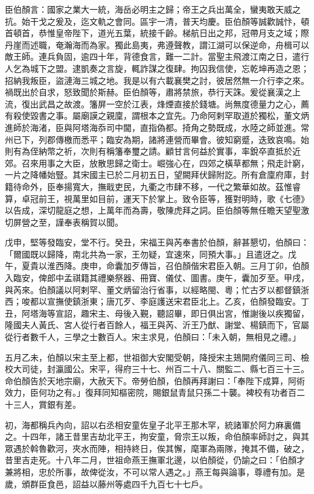 \begin{pinyinscope}
 臣伯顏言：國家之業大一統，海岳必明主之歸；帝王之兵出萬全，蠻夷敢天威之抗。始干戈之爰及，迄文軌之會同。區宇一清，普天均慶。臣伯顏等誠歡誠忭，頓首頓首，恭惟皇帝陛下，道光五葉，統接千齡。梯航日出之邦，冠帶月支之域；際丹崖而述職，奄瀚海而為家。獨此島夷，弗遵聲教，謂江湖可以保逆命，舟楫可以敵王師。連兵負固，逾四十年，背德食言，難一二計。當聖主飛渡江南之日，遣行人乞為城下之盟。逮凱奏之言旋，輒詐謀之復肆。拘囚我信使，忘乾坤再造之恩；招納我叛臣，盜漣海三城之地。我是以有六載襄樊之討，彼居然無一介行李之來。禍既出於自求，怒致聞於斯赫。臣伯顏等，肅將禁旅，恭行天誅。爰從襄漢之上流，復出武昌之故渡。籓屏一空於江表，烽煙直接於錢塘。尚無度德量力之心，薦有殺使毀書之事。屬廟謨之親廩，謂根本之宜先。乃命阿剌罕取道於獨松，董文炳進師於海渚，臣與阿塔海忝司中閫，直指偽都。掎角之勢既成，水陸之師並進。常州已下，列郡傳檄而悉平；臨安為期，諸將連營而畢會。彼知窮蹙，迭致哀鳴。始則有為侄納幣之祈，次則有稱籓奉璽之請。顧甘言何益於實事，率銳卒直抵於近郊。召來用事之大臣，放散思歸之衛士。崛強心在，四郊之橫草都無；飛走計窮，一片之降幡始豎。其宋國主已於二月初五日，望闕拜伏歸附訖。所有倉廩府庫，封籍待命外，臣奉揚寬大，撫戢吏民，九衢之市肆不移，一代之繁華如故。茲惟睿算，卓冠前王，視萬里如目前，運天下於掌上。致令臣等，獲對明時，歌《七德》以告成，深切龍庭之想，上萬年而為壽，敬陳虎拜之詞。臣伯顏等無任瞻天望聖激切屏營之至，謹奉表稱賀以聞。



 戊申，堅等發臨安，堂不行。癸丑，宋福王與芮奉書於伯顏，辭甚懇切，伯顏曰：「爾國既以歸降，南北共為一家，王勿疑，宜速來，同預大事。」且遣迓之。戊午，夏貴以淮西降。庚申，命囊加歹傳旨，召伯顏偕宋君臣入朝。三月丁卯，伯顏入臨安，俾郎中孟祺籍其禮樂祭器、冊寶、儀仗、圖書。庚午，囊加歹至。甲戌，與芮來。伯顏議以阿剌罕、董文炳留治行省事，以經略閩、粵；忙古歹以都督鎮浙西；唆都以宣撫使鎮浙東；唐兀歹、李庭護送宋君臣北上。乙亥，伯顏發臨安。丁丑，阿塔海等宣詔，趣宋主、母後入覲，聽詔畢，即日俱出宮，惟謝後以疾獨留，隆國夫人黃氏、宮人從行者百餘人，福王與芮、沂王乃猷、謝堂、楊鎮而下，官屬從行者數千人，三學之士數百人。宋主求見，伯顏曰：「未入朝，無相見之禮。」



 五月乙未，伯顏以宋主至上都，世祖御大安閣受朝，降授宋主鳷開府儀同三司、檢校大司徒，封瀛國公。宋平，得府三十七、州百二十八、關監二、縣七百三十三。命伯顏告於天地宗廟，大赦天下。帝勞伯顏，伯顏再拜謝曰：「奉陛下成算，阿術效力，臣何功之有。」復拜同知樞密院，賜銀鼠青鼠只孫二十襲。裨校有功者百二十三人，賞銀有差。



 初，海都稱兵內向，詔以右丞相安童佐皇子北平王那木罕，統諸軍於阿力麻裏備之。十四年，諸王昔里吉劫北平王，拘安童，脅宗王以叛，命伯顏率師討之，與其眾遇於斡魯歡河，夾水而陣，相持終日，俟其懈，麾軍為兩隊，掩其不備，破之，昔里吉走死。十八年二月，世祖命燕王撫軍北邊，以伯顏從，仍諭之曰：「伯顏才兼將相，忠於所事，故俾從汝，不可以常人遇之。」燕王每與論事，尊禮有加。是歲，頒群臣食邑，詔益以藤州等處四千九百七十七戶。




\end{pinyinscope}
